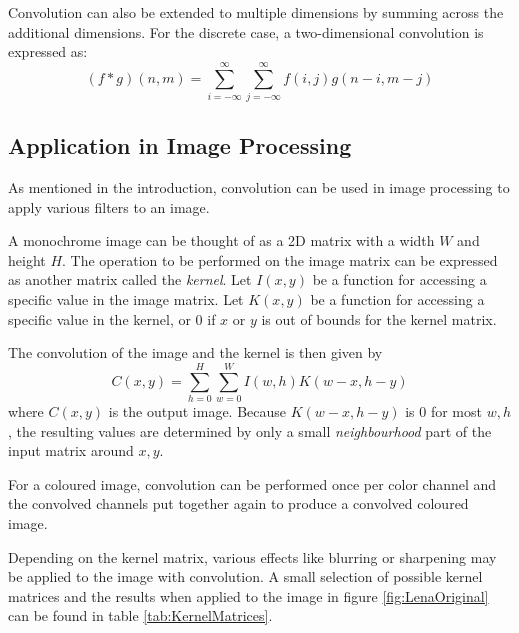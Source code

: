 Convolution can also be extended to multiple dimensions by summing across the additional dimensions.
For the discrete case, a two-dimensional convolution is expressed as:
\[
    (f * g)(n, m) = \sum^{\infty}_{i=-\infty}\sum^{\infty}_{j=-\infty}{f(i, j)g(n-i, m-j)}
\]

\subsection{Application in Image Processing}
As mentioned in the introduction, convolution can be used in image processing to apply various filters to an image.

A monochrome image can be thought of as a 2D matrix with a width $W$ and height $H$.
The operation to be performed on the image matrix can be expressed as another matrix called the \textit{kernel}.
Let $I(x, y)$ be a function for accessing a specific value in the image matrix.
Let $K(x, y)$ be a function for accessing a specific value in the kernel,
or $0$ if $x$ or $y$ is out of bounds for the kernel matrix.

The convolution of the image and the kernel is then given by
\[
    C(x, y) = \sum^{H}_{h=0} \sum^{W}_{w=0}{I(w, h)K(w - x, h - y)}
\]
where $C(x, y)$ is the output image.
Because $K(w - x, h - y)$ is $0$ for most $w, h$, the resulting values are determined by only a small \textit{neighbourhood} part of the input matrix around $x, y$.

For a coloured image, convolution can be performed once per color channel and the convolved channels put together again to produce a convolved coloured image.

Depending on the kernel matrix, various effects like blurring or sharpening may be applied to the image with convolution.
A small selection of possible kernel matrices and the results when applied to the image in figure \ref{fig:LenaOriginal} can be found in table \ref{tab:KernelMatrices}.

